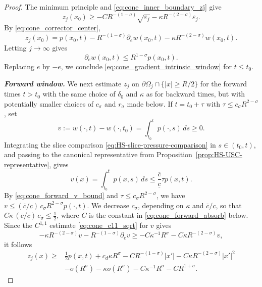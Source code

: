\documentclass[10pt,a4paper]{amsart}
\begin{document}
\begin{proof}
The minimum principle and \eqref{eq:cone_inner_boundary_zj} give
\[
    z_j(x_0)\geq
    -CR^{-(1-\sigma)}\sqrt{\varepsilon_j}
    -\kappa R^{-(2-\sigma)}\varepsilon_j.
\]
By \eqref{eq:cone_corrector_center},
\[
    z_j(x_0)=p(x_0,t)-R^{-(1-\sigma)}\partial_e w(x_0,t)
    -\kappa R^{-(2-\sigma)}w(x_0,t).
\]
Letting \(j\to\infty\) gives
\[
    \partial_e w(x_0,t)\leq R^{1-\sigma}p(x_0,t).
\]
Replacing \(e\) by \(-e\), we conclude \eqref{eq:cone_gradient_intrinsic_window} for $t\leq t_0$.


\textbf{\emph{Forward window.}}
We next estimate $z_j$ on $\partial\Omega_j \cap \{|x|\geq R/2\}$ for the forward times $t>t_0$ with the same choice of $\delta_0$ and $\kappa$ as for backward times, but with potentially smaller choices of \(c_\sigma\) and
\(r_\sigma\) made below. 
If \(t=t_0+\tau\) with
\(\tau\leq c_\sigma R^{2-\sigma}\), set
\[
    v:=w(\cdot,t)-w(\cdot,t_0)=\int_{t_0}^t p(\cdot,s)\,ds\geq0.
\]
Integrating the slice comparison
\eqref{eq:HS-slice-pressure-comparison} in \(s\in(t_0,t)\), and passing to the
canonical representative from Proposition~\ref{prop:HS-USC-representative}, gives
\begin{equation}\label{eq:cone_forward_v_bound}
    v(x)=\int_{t_0}^t p(x,s)\,ds
    \leq \frac{\overline c}{\underline c}\tau p(x,t).
\end{equation}
By \eqref{eq:cone_forward_v_bound} and \(\tau\leq c_\sigma R^{2-\sigma}\), we have
\(v\leq(\overline c/\underline c)\,c_\sigma R^{2-\sigma}p(\cdot,t)\). We decrease
\(c_\sigma\), depending on \(\kappa\) and \(\overline c/\underline c\), so that
\(C\kappa\,(\overline c/\underline c)\,c_\sigma\leq\tfrac12\), where \(C\) is the constant
in \eqref{eq:cone_forward_absorb} below.
Since the \(C^{1,1}\) estimate \eqref{eq:cone_c11_sqrt} for \(v\) gives
\begin{equation}\label{eq:cone_forward_absorb}
    -\kappa R^{-(2-\sigma)}v-R^{-(1-\sigma)}\partial_ev
    \geq
    -C\kappa^{-1}R^\sigma-C\kappa R^{-(2-\sigma)}v,
\end{equation}
it follows 
\begin{equation}\label{eq:cone_forward_outer_common}
    \begin{aligned}
    z_j(x)\geq{}&\frac12p(x,t)+c_d\kappa R^\sigma
    -CR^{-(1-\sigma)}|x'|
    -C\kappa R^{-(2-\sigma)}|x'|^2\\
    &-o(R^\sigma)-\kappa o(R^\sigma)
    -C\kappa^{-1}R^\sigma-CR^{1+\sigma}.
    \end{aligned}
\end{equation}


\end{proof}
\end{document}
